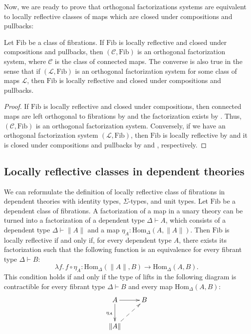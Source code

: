 \documentclass[reqno]{amsart}
\theoremstyle{definition}
\theoremstyle{remark}
\newcommand{\ob}{}
\newcommand{\fs}[1]{\mathrm{#1}}
\newcommand{\Hom}{\fs{Hom}}
\newcommand{\Fib}{\fs{Fib}}
\numberwithin{figure}{section}
\begin{document}
Now, we are ready to prove that orthogonal factorizations systems are equivalent to locally reflective classes of maps which are closed under compositions and pullbacks:

\begin{thm}
Let $\Fib$ be a class of fibrations.
If $\Fib$ is locally reflective and closed under compositions and pullbacks, then $(\mathcal{C},\Fib)$ is an orthogonal factorization system, where $\mathcal{C}$ is the class of connected maps.
The converse is also true in the sense that if $(\mathcal{L},\Fib)$ is an orthogonal factorization system for some class of maps $\mathcal{L}$, then $\Fib$ is locally reflective and closed under compositions and pullbacks.
\end{thm}
\begin{proof}
If $\Fib$ is locally reflective and closed under compositions, then connected maps are left orthogonal to fibrations by  and the factorization exists by .
Thus, $(\mathcal{C},\Fib)$ is an orthogonal factorization system.
Conversely, if we have an orthogonal factorization system $(\mathcal{L},\Fib)$, then $\Fib$ is locally reflective by  and it is closed under compositions and pullbacks by  and , respectively.
\end{proof}

\subsection{Locally reflective classes in dependent theories}

We can reformulate the definition of locally reflective class of fibrations in dependent theories with identity types, $\Sigma$-types, and unit types.
Let $\Fib$ be a dependent class of fibrations.
A factorization of a map in a unary theory can be turned into a factorization of a dependent type $\Delta \vdash A \ob$, which consists of a dependent type $\Delta \vdash \| A \| \ob$ and a map $\eta_A : \Hom_\Delta(A, \| A \|)$.
Then $\Fib$ is locally reflective if and only if, for every dependent type $A$, there exists its factorization such that the following function is an equivalence for every fibrant type $\Delta \vdash B \ob$:
\[ \lambda f.\, f \circ \eta_A : \Hom_\Delta(\| A \|, B) \to \Hom_\Delta(A, B). \]
This condition holds if and only if the type of lifts in the following diagram is contractible for every fibrant type $\Delta \vdash B \ob$ and every map $\Hom_\Delta(A,B)$:
\[ \xymatrix{ A \ar[r] \ar[d]_{\eta_A} & B \\
              \| A \| \ar@{-->}[ur]
            } \]
\end{document}
